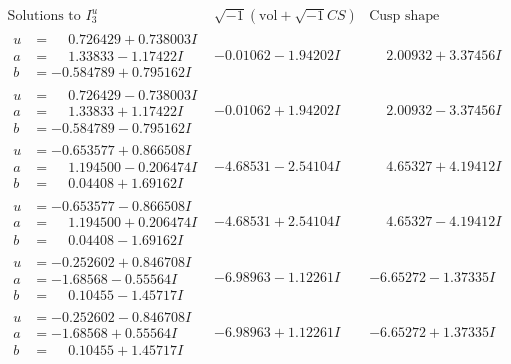 \documentclass[1p]{elsarticle_modified}
\theoremstyle{definition}
\newcommand{\I}{\sqrt{-1}}
\begin{document}
$$\begin{array}{c|c|c}  
\text{Solutions to }I^u_{3}& \I (\text{vol} + \sqrt{-1}CS) & \text{Cusp shape}\\
 \hline 
\begin{aligned}
u &= \phantom{-}0.726429 + 0.738003 I \\
a &= \phantom{-}1.33833 - 1.17422 I \\
b &= -0.584789 + 0.795162 I\end{aligned}
 & -0.01062 - 1.94202 I & \phantom{-}2.00932 + 3.37456 I \\ \hline\begin{aligned}
u &= \phantom{-}0.726429 - 0.738003 I \\
a &= \phantom{-}1.33833 + 1.17422 I \\
b &= -0.584789 - 0.795162 I\end{aligned}
 & -0.01062 + 1.94202 I & \phantom{-}2.00932 - 3.37456 I \\ \hline\begin{aligned}
u &= -0.653577 + 0.866508 I \\
a &= \phantom{-}1.194500 - 0.206474 I \\
b &= \phantom{-}0.04408 + 1.69162 I\end{aligned}
 & -4.68531 - 2.54104 I & \phantom{-}4.65327 + 4.19412 I \\ \hline\begin{aligned}
u &= -0.653577 - 0.866508 I \\
a &= \phantom{-}1.194500 + 0.206474 I \\
b &= \phantom{-}0.04408 - 1.69162 I\end{aligned}
 & -4.68531 + 2.54104 I & \phantom{-}4.65327 - 4.19412 I \\ \hline\begin{aligned}
u &= -0.252602 + 0.846708 I \\
a &= -1.68568 - 0.55564 I \\
b &= \phantom{-}0.10455 - 1.45717 I\end{aligned}
 & -6.98963 - 1.12261 I & -6.65272 - 1.37335 I \\ \hline\begin{aligned}
u &= -0.252602 - 0.846708 I \\
a &= -1.68568 + 0.55564 I \\
b &= \phantom{-}0.10455 + 1.45717 I\end{aligned}
 & -6.98963 + 1.12261 I & -6.65272 + 1.37335 I \\ \hline\begin{aligned}

\end{aligned}
\end{array}$$
\end{document}
